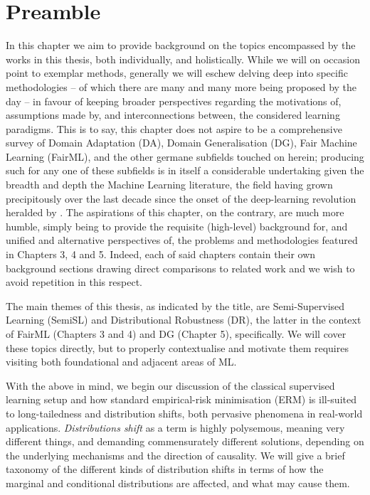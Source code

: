 \section{Preamble}
\noindent
%
In this chapter we aim to provide background on the topics encompassed by the works in this thesis,
both individually, and holistically.
%
While we will on occasion point to exemplar methods, generally we will eschew delving deep into
specific methodologies -- of which there are many and many more being proposed by the day -- in
favour of keeping broader perspectives regarding the motivations of, assumptions made by, and
interconnections between, the considered learning paradigms. 
%
This is to say, this chapter does not aspire to be a comprehensive survey of Domain Adaptation
(DA), Domain Generalisation (DG), Fair Machine Learning (FairML), and the other germane subfields
touched on herein; producing such for any one of these subfields is in itself a considerable
undertaking given the breadth and depth the Machine Learning literature, the field having grown
precipitously over the last decade since the onset of the deep-learning revolution heralded by
\cite{Krizhevsky2012imagenet}.
%
The aspirations of this chapter, on the contrary, are much more humble, simply being to provide the
requisite (high-level) background for, and unified and alternative perspectives of, the problems
and methodologies featured in Chapters 3, 4 and 5.
%
Indeed, each of said chapters contain their own background sections drawing direct comparisons to
related work and we wish to avoid repetition in this respect.

The main themes of this thesis, as indicated by the title, are Semi-Supervised Learning (SemiSL)
and Distributional Robustness (DR), the latter in the context of FairML (Chapters 3 and 4) and DG
(Chapter 5), specifically. 
%
We will cover these topics directly, but to properly contextualise and motivate them requires
visiting both foundational and adjacent areas of ML.

%
With the above in mind, we begin our discussion of the classical supervised learning setup and how
standard empirical-risk minimisation (ERM) is ill-suited to long-tailedness and distribution shifts,
both pervasive phenomena in real-world applications. \emph{Distributions shift} as a term is highly
polysemous, meaning very different things, and demanding commensurately different solutions,
depending on the underlying mechanisms and the direction of causality. We will give a brief
taxonomy of the different kinds of distribution shifts in terms of how the marginal and conditional
distributions are affected, and what may cause them. 

